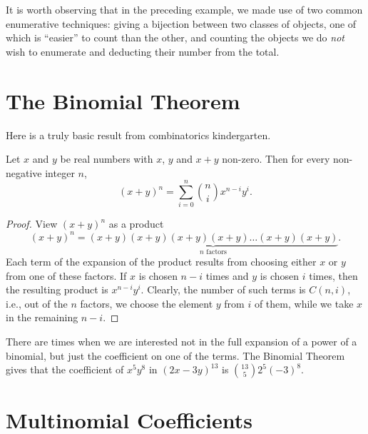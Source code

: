 It is worth observing that in the preceding example, we made use of
two common enumerative techniques: giving a bijection between two
classes of objects, one of which is ``easier'' to count than the
other, and counting the objects we do \textit{not} wish to enumerate
and deducting their number from the total.

\section{The Binomial Theorem}\label{s:strings:binom-thm}

Here is a truly basic result from combinatorics kindergarten.

\begin{theorem}\label{thm:binomial}
Let $x$ and $y$ be real numbers with $x$, $y$ and $x+y$ non-zero.
Then for every non-negative integer $n$,
\[
(x+y)^n=\sum_{i=0}^{n}\binom{n}{i}x^{n-i}y^{i}.
\]
\end{theorem}

\begin{proof}
View $(x+y)^n$ as a product
\[ 
(x+y)^n=\underbrace{(x+y)(x+y)(x+y)(x+y)\dots(x+y)(x+y)}_{n\text{ factors}}.
\]
Each term of the expansion of the product results from choosing either
$x$ or $y$ from one of these factors.  If $x$ is chosen $n-i$ times
and $y$ is chosen $i$ times, then the resulting product is
$x^{n-i}y^i$.  Clearly, the number of such terms is $C(n,i)$, i.e.,
out of the $n$ factors, we choose the element $y$ from $i$ of them,
while we take $x$ in the remaining $n-i$.
\end{proof}

\begin{example}
  There are times when we are interested not in the full expansion of
  a power of a binomial, but just the coefficient on one of the
  terms. The Binomial Theorem gives that the coefficient of $x^5y^8$
  in $(2x-3y)^{13}$ is $\binom{13}{5}2^{5}(-3)^8$.
\end{example}

\section{Multinomial Coefficients}\label{s:strings:multinom}

